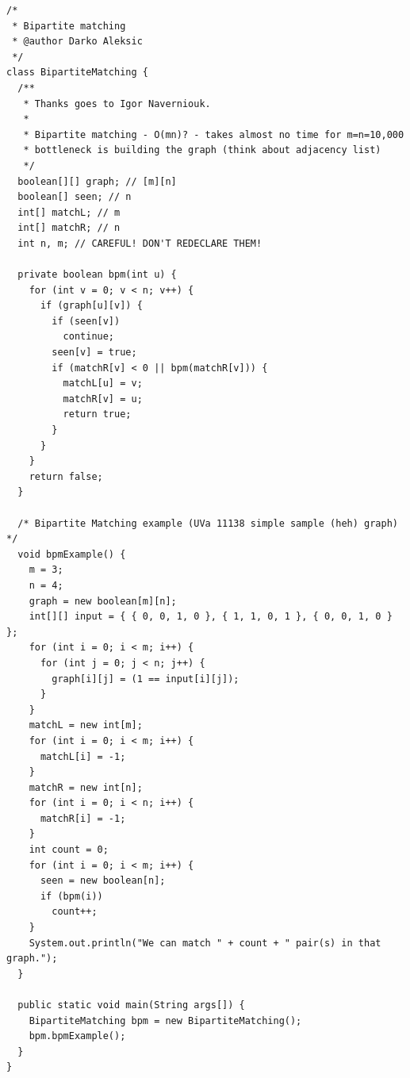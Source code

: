 \documentclass{article}
\begin{document}
    \begin{verbatim}
/*
 * Bipartite matching
 * @author Darko Aleksic
 */
class BipartiteMatching {
  /**
   * Thanks goes to Igor Naverniouk.
   * 
   * Bipartite matching - O(mn)? - takes almost no time for m=n=10,000
   * bottleneck is building the graph (think about adjacency list)
   */
  boolean[][] graph; // [m][n]
  boolean[] seen; // n
  int[] matchL; // m
  int[] matchR; // n
  int n, m; // CAREFUL! DON'T REDECLARE THEM!

  private boolean bpm(int u) {
    for (int v = 0; v < n; v++) {
      if (graph[u][v]) {
        if (seen[v])
          continue;
        seen[v] = true;
        if (matchR[v] < 0 || bpm(matchR[v])) {
          matchL[u] = v;
          matchR[v] = u;
          return true;
        }
      }
    }
    return false;
  }

  /* Bipartite Matching example (UVa 11138 simple sample (heh) graph) */
  void bpmExample() {
    m = 3;
    n = 4;
    graph = new boolean[m][n];
    int[][] input = { { 0, 0, 1, 0 }, { 1, 1, 0, 1 }, { 0, 0, 1, 0 } };
    for (int i = 0; i < m; i++) {
      for (int j = 0; j < n; j++) {
        graph[i][j] = (1 == input[i][j]);
      }
    }
    matchL = new int[m];
    for (int i = 0; i < m; i++) {
      matchL[i] = -1;
    }
    matchR = new int[n];
    for (int i = 0; i < n; i++) {
      matchR[i] = -1;
    }
    int count = 0;
    for (int i = 0; i < m; i++) {
      seen = new boolean[n];
      if (bpm(i))
        count++;
    }
    System.out.println("We can match " + count + " pair(s) in that graph.");
  }

  public static void main(String args[]) {
    BipartiteMatching bpm = new BipartiteMatching();
    bpm.bpmExample();
  }
}

    \end{verbatim}
\end{document}
